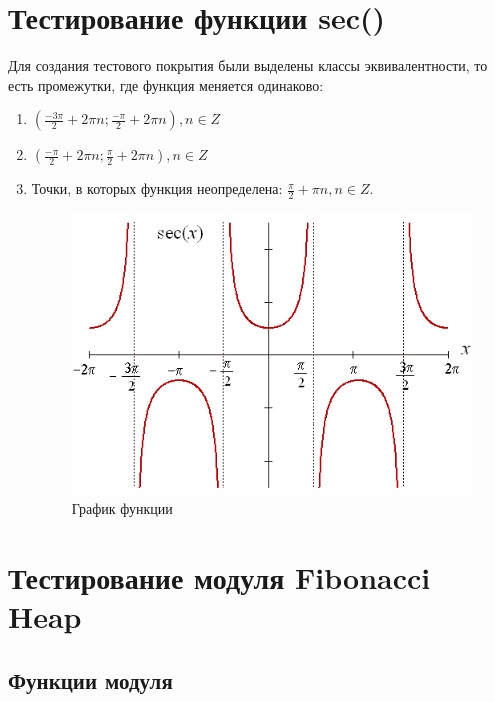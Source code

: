 \documentclass[a4paper,10pt]{article}
\begin{document}
\section*{Тестирование функции sec()}
Для создания тестового покрытия были выделены классы эквивалентности, то есть промежутки, где функция меняется одинаково:
\begin{enumerate}
    \item $(\frac {-3\pi} {2} + 2\pi n; \frac {-\pi} {2} + 2\pi n), n \in Z$
    \item $(\frac {-\pi} {2} + 2\pi n; \frac {\pi} {2} + 2\pi n), n \in Z$
    \item Точки, в которых функция неопределена: $\frac {\pi} {2} + \pi n, n \in Z$.

\begin{figure}[h!]
	\caption{График функции}
	\includegraphics[scale=0.4]{./img/sec_plot.png}
\end{figure}

\end{enumerate}

\section*{Тестирование модуля Fibonacci Heap}

    \subsection*{Функции модуля}
\end{document}
